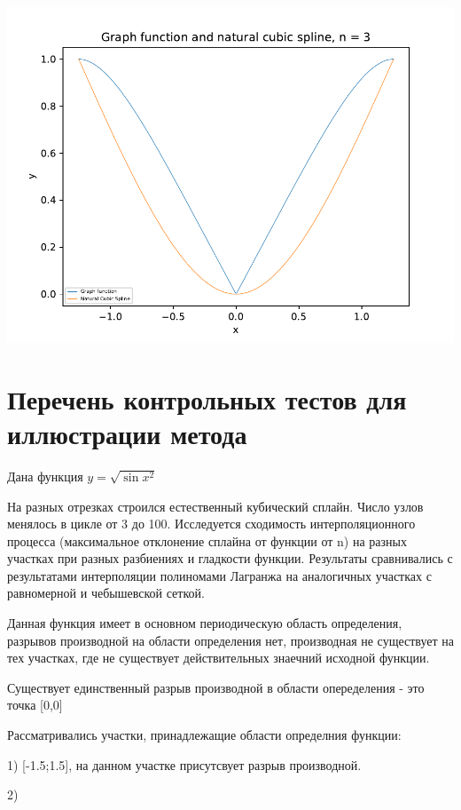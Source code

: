 \includegraphics[scale=0.75]{13.pdf}


\section{Перечень контрольных тестов для иллюстрации метода}

Дана функция 
\begin{math} 
	y=\sqrt{\sin{x^{2}}}
\end{math}

На разных отрезках строился естественный кубический сплайн. Число узлов менялось в цикле от 3 до 100. Исследуется сходимость интерполяционного процесса (максимальное отклонение сплайна от функции от n) на разных участках при разных разбиениях и гладкости функции. Результаты сравнивались с результатами интерполяции полиномами Лагранжа на аналогичных участках с равномерной и чебышевской сеткой. 

Данная функция имеет в основном периодическую область определения, разрывов производной на области определения нет, производная не существует на тех участках, где не существует действительных знаечний исходной функции. 

Существует единственный разрыв производной в области опеределения - это точка [0,0]

Рассматривались участки, принадлежащие области определния функции: 

1) [-1.5;1.5], на данном участке присутсвует разрыв производной. 

2) \begin{math} 
	[\sqrt{300*\pi}; \sqrt{301*\pi}]
\end{math}

